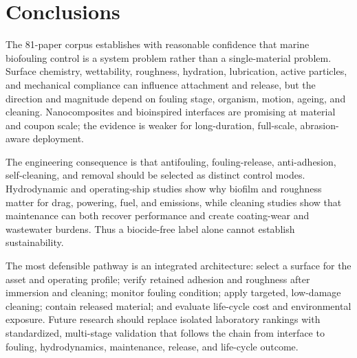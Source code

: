 \section{Conclusions}
The 81-paper corpus establishes with reasonable confidence that marine biofouling control is a system problem rather than a single-material problem. Surface chemistry, wettability, roughness, hydration, lubrication, active particles, and mechanical compliance can influence attachment and release, but the direction and magnitude depend on fouling stage, organism, motion, ageing, and cleaning. Nanocomposites and bioinspired interfaces are promising at material and coupon scale; the evidence is weaker for long-duration, full-scale, abrasion-aware deployment.

The engineering consequence is that antifouling, fouling-release, anti-adhesion, self-cleaning, and removal should be selected as distinct control modes. Hydrodynamic and operating-ship studies show why biofilm and roughness matter for drag, powering, fuel, and emissions, while cleaning studies show that maintenance can both recover performance and create coating-wear and wastewater burdens. Thus a biocide-free label alone cannot establish sustainability.

The most defensible pathway is an integrated architecture: select a surface for the asset and operating profile; verify retained adhesion and roughness after immersion and cleaning; monitor fouling condition; apply targeted, low-damage cleaning; contain released material; and evaluate life-cycle cost and environmental exposure. Future research should replace isolated laboratory rankings with standardized, multi-stage validation that follows the chain from interface to fouling, hydrodynamics, maintenance, release, and life-cycle outcome.
